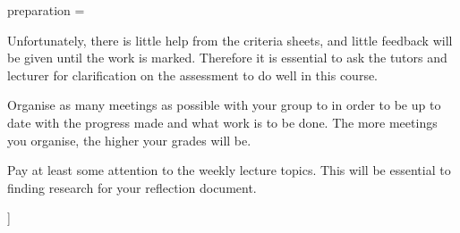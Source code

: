 preparation = {
    \item Unfortunately, there is little help from the criteria sheets, and little feedback will be given until the work is marked. Therefore it is essential to ask the tutors and lecturer for clarification on the assessment to do well in this course.
    \item Organise as many meetings as possible with your group to in order to be up to date with the progress made and what work is to be done. The more meetings you organise, the higher your grades will be.
    \item Pay at least some attention to the weekly lecture topics. This will be essential to finding research for your reflection document.
}]{}
